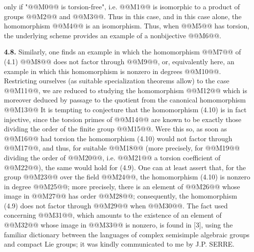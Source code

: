 only if "@@M0@@ is torsion-free", i.e. @@M1@@ is isomorphic to a product of groups @@M2@@ and @@M3@@. Thus in this case, and in this case alone, the homomorphism
@@M4@@
is an isomorphism. Thus, when @@M5@@ has torsion, the underlying scheme provides an example of a nonbijective @@M6@@.

\textbf{4.8.} Similarly, one finds an example in which the homomorphism @@M7@@ of (4.1)
@@M8@@
does not factor through @@M9@@, or, equivalently here, an example in which this homomorphism is nonzero in degrees @@M10@@. Restricting ourselves (as suitable specialization theorems allow) to the case @@M11@@, we are reduced to studying the homomorphism
@@M12@@
which is moreover deduced by passage to the quotient from the canonical homomorphism
@@M13@@
It is tempting to conjecture that the homomorphism (4.10) is in fact injective, since the torsion primes of @@M14@@ are known to be exactly those dividing the order of the finite group @@M15@@. Were this so, as soon as @@M16@@ had torsion the homomorphism (4.10) would not factor through @@M17@@, and thus, for suitable @@M18@@ (more precisely, for @@M19@@ dividing the order of @@M20@@, i.e. @@M21@@ a torsion coefficient of @@M22@@), the same would hold for (4.9). One can at least assert that, for the group @@M23@@ over the field @@M24@@, the homomorphism (4.10) is nonzero in degree @@M25@@; more precisely, there is an element of @@M26@@ whose image in @@M27@@ has order @@M28@@; consequently, the homomorphism (4.9) does not factor through @@M29@@ when @@M30@@. The fact used concerning @@M31@@, which amounts to the existence of an element of @@M32@@ whose image in @@M33@@ is nonzero, is found in [3], using the familiar dictionary between the languages of complex semisimple algebraic groups and compact Lie groups; it was kindly communicated to me by J.P. SERRE.

